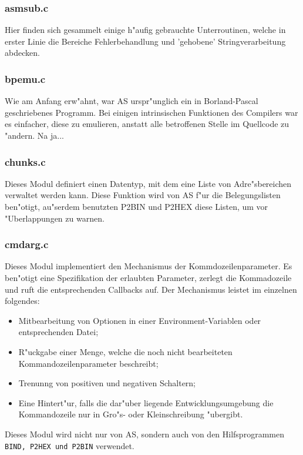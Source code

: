 \documentclass[12pt,a4paper,twoside]{report}
\newcommand{\tty}[1]{{\tt #1}}
\newcommand{\asname}{AS}
\begin{document}
\subsubsection{asmsub.c}

Hier finden sich gesammelt einige h"aufig gebrauchte Unterroutinen, welche
in erster Linie die Bereiche Fehlerbehandlung und 'gehobene'
Stringverarbeitung abdecken.

\subsubsection{bpemu.c}

Wie am Anfang erw"ahnt, war \asname{} urspr"unglich ein in Borland-Pascal
geschriebenes Programm.  Bei einigen intrinsischen Funktionen des
Compilers war es einfacher, diese zu emulieren, anstatt alle betroffenen
Stelle im Quellcode zu "andern. Na ja...

\subsubsection{chunks.c}

Dieses Modul definiert einen Datentyp, mit dem eine Liste von
Adre"sbereichen verwaltet werden kann.  Diese Funktion wird von \asname{}
f"ur die Belegungslisten ben"otigt, au"serdem benutzten P2BIN und
P2HEX diese Listen, um vor "Uberlappungen zu warnen.

\subsubsection{cmdarg.c}

Dieses Modul implementiert den Mechanismus der Kommdozeilenparameter.  Es
ben"otigt eine Spezifikation der erlaubten Parameter, zerlegt die
Kommadozeile und ruft die entsprechenden Callbacks auf.  Der Mechanismus
leistet im einzelnen folgendes:
\begin{itemize}
\item{Mitbearbeitung von Optionen in einer Environment-Variablen oder
      entsprechenden Datei;}
\item{R"uckgabe einer Menge, welche die noch nicht bearbeiteten
      Kommandozeilenparameter beschreibt;}
\item{Trenunng von positiven und negativen Schaltern;}
\item{Eine Hintert"ur, falls die dar"uber liegende Entwicklungsumgebung die
      Kommandozeile nur in Gro"s- oder Kleinschreibung "ubergibt.}
\end{itemize}
Dieses Modul wird nicht nur von \asname{}, sondern auch von den Hilfsprogrammen
\tty{BIND, P2HEX und P2BIN} verwendet.
\end{document}
